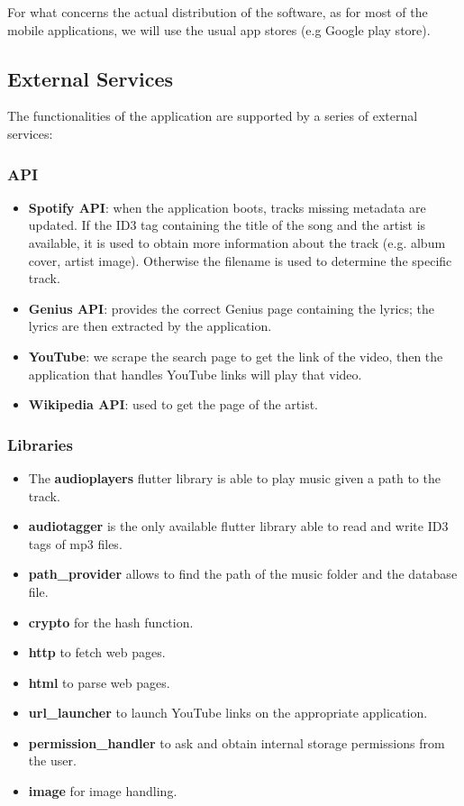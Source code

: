 \documentclass{article}
\begin{document}
For what concerns the actual distribution of the software, as for most of the
mobile applications, we will use the usual app stores (e.g Google play store).

\newpage

\subsection{External Services}
The functionalities of the application are supported by a series of external
services:

\subsubsection{API}
\begin{itemize}
    \item \textbf{Spotify API}: when the application boots, tracks missing metadata are
    updated. If the ID3 tag containing the title of the song and the artist is
    available, it is used to obtain more information about the track (e.g. album
    cover, artist image). Otherwise the filename is used to determine the
    specific track.
    \item \textbf{Genius API}: provides the correct Genius page containing the lyrics;
    the lyrics are then extracted by the application.
    \item \textbf{YouTube}: we scrape the search page to get the link of the video, then
    the application that handles YouTube links will play that video.
    \item \textbf{Wikipedia API}: used to get the page of the artist.
\end{itemize}

\subsubsection{Libraries}
\begin{itemize}
    \item The \textbf{audioplayers} flutter library is able to play music given
    a path to the track.
    \item \textbf{audiotagger} is the only available flutter library able to
    read and write ID3 tags of mp3 files.
    \item \textbf{path\_provider} allows to find the path of the music folder and
    the database file.
    \item \textbf{crypto} for the hash function.
    \item \textbf{http} to fetch web pages.
    \item \textbf{html} to parse web pages.
    \item \textbf{url\_launcher} to launch YouTube links on the appropriate
    application.
    \item \textbf{permission\_handler} to ask and obtain internal storage
    permissions from the user.
    \item \textbf{image} for image handling.
\end{itemize}
\end{document}

